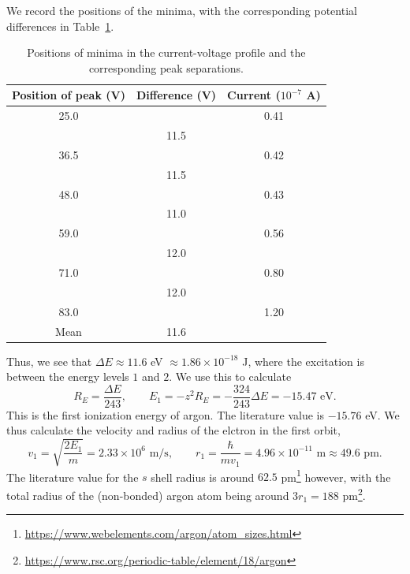 \documentclass[11pt]{article}
\begin{document}
        We record the positions of the minima, with the corresponding potential differences in Table~\ref{tab:diff}.
        \begin{table}[H]
                \centering
                \caption{Positions of minima in the current-voltage profile and the corresponding peak separations.}
                \label{tab:diff}
                \begin{tabular}{ccc}\hline
                Position of peak (V)    &       Difference (V)  &       Current ($10^{-7}$ A)       \\\hline\hline
                        25.0            &                       &       0.41    \\
                                        &       11.5            &               \\
                        36.5            &                       &       0.42    \\
                                        &       11.5            &               \\
                        48.0            &                       &       0.43    \\
                                        &       11.0            &               \\
                        59.0            &                       &       0.56    \\
                                        &       12.0            &               \\
                        71.0            &                       &       0.80    \\
                                        &       12.0            &               \\
                        83.0            &                       &       1.20    \\\hline
                        Mean            &       11.6            &               \\\hline
                \end{tabular}
        \end{table}

        Thus, we see that $\Delta E \approx 11.6$ eV $\approx 1.86\times 10^{-18}$ J, where the excitation is between the energy levels $1$ and $2$.
        We use this to calculate
        \[
                R_E = \frac{\Delta E}{243}, \qquad E_1 = -z^2 R_E = -\frac{324}{243}\Delta E = -15.47 \text{ eV}.
        \]
        This is the first ionization energy of argon. The literature value is $-15.76$ eV.
        We thus calculate the velocity and radius of the elctron in the first orbit,
        \[
                v_1 = \sqrt{\frac{2E_1}{m}} = 2.33\times 10^{6} \text{ m/s}, \qquad r_1 = \frac{\hbar}{mv_1} = 4.96\times 10^{-11}\text{ m} \approx
                        49.6 \text{ pm}.
        \]
        The literature value for the $s$ shell radius is around $62.5$ pm\footnote{\url{https://www.webelements.com/argon/atom_sizes.html}}
        however, with the total radius of the (non-bonded) argon atom being around $3r_1 = 188$ pm\footnote{
        \url{https://www.rsc.org/periodic-table/element/18/argon}}.
\end{document}
